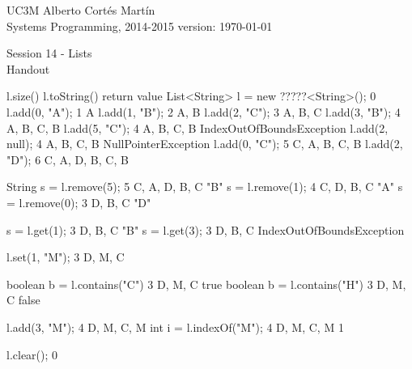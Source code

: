 \documentclass[a4paper, 10pt]{article}
\newcommand{\realtitle}{Session 14 - Lists}
\begin{document}
\footnotesize{
\makebox[\linewidth]{\rule{\textwidth}{0.4pt}}
UC3M \hfill Alberto Cortés Martín\\
Systems Programming, 2014-2015 \hfill version: \today\\
\makebox[\linewidth]{\rule{\textwidth}{0.4pt}}
\begin{center}
  \small{\realtitle}\\Handout
\end{center}
\makebox[\linewidth]{\rule{\textwidth}{0.4pt}}
}
\vspace{1cm}


\footnotesize{
\begin{blackboard}
                         l.size()    l.toString()         return value
  List<String> l =
    new ?????<String>();        0    {}
  l.add(0, "A");                1    {A}
  l.add(1, "B");                2    {A, B}
  l.add(2, "C");                3    {A, B, C}
  l.add(3, "B");                4    {A, B, C, B}
  l.add(5, "C");                4    {A, B, C, B}         IndexOutOfBoundsException
  l.add(2, null);               4    {A, B, C, B}         NullPointerException
  l.add(0, "C");                5    {C, A, B, C, B}
  l.add(2, "D");                6    {C, A, D, B, C, B}

  String s = l.remove(5);       5    {C, A, D, B, C}     "B"
  s = l.remove(1);              4    {C, D, B, C}        "A"
  s = l.remove(0);              3    {D, B, C}           "D"

  s = l.get(1);                 3    {D, B, C}           "B"
  s = l.get(3);                 3    {D, B, C}           IndexOutOfBoundsException

  l.set(1, "M");                3    {D, M, C}

  boolean b = l.contains("C")   3    {D, M, C}           true
  boolean b = l.contains("H")   3    {D, M, C}           false

  l.add(3, "M");                4    {D, M, C, M}
  int i = l.indexOf("M");       4    {D, M, C, M}        1

  l.clear();                    0    {}
\end{blackboard}
}
\end{document}
